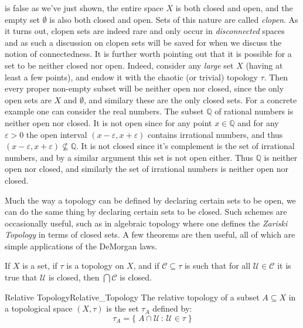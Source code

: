     is false as we've just shown, the entire space $X$ is both closed and open,
    and the empty set $\emptyset$ is also both closed and open. Sets of this
    nature are called \textit{clopen}. As it turns out, clopen
    sets are indeed rare and only occur in \textit{disconnected}
    spaces and
    as such a discussion on clopen sets will be saved for when we discuss the
    notion of connectedness. It is further worth pointing out that it is
    possible for a set to be neither closed nor open. Indeed, consider any
    \textit{large} set $X$ (having at least a few points), and endow it with the
    chaotic (or trivial) topology $\tau$. Then every proper non-empty subset
    will be neither open nor closed, since the only open sets are $X$ and
    $\emptyset$, and similary these are the only closed sets. For a concrete
    example one can consider the real numbers. The subset $\mathbb{Q}$ of
    rational numbers is neither open nor closed. It is not open since
    for any point $x\in\mathbb{Q}$ and for any $\varepsilon>0$ the open interval
    $(x-\varepsilon,x+\varepsilon)$ contains irrational numbers, and thus
    $(x-\varepsilon,x+\varepsilon)\nsubseteq\mathbb{Q}$. It is not closed since
    it's complement is the set of irrational numbers, and by a similar argument
    this set is not open either. Thus $\mathbb{Q}$ is neither open nor closed,
    and similarly the set of irrational numbers is neither open nor closed.
    \par\hfill\par
    Much the way a topology can be defined by declaring certain sets to be open,
    we can do the same thing by declaring certain sets to be closed. Such
    schemes are occasionally useful, such as in algebraic topology where one
    defines the \textit{Zariski Topology} in terms of
    closed sets. A few theorems are then useful, all of which are simple
    applications of the DeMorgan laws.
    \begin{theorem}
        If $X$ is a set, if $\tau$ is a topology on $X$, and if
        $\mathcal{C}\subseteq\tau$ is such that for all
        $\mathcal{U}\in\mathcal{C}$ it is true that $\mathcal{U}$ is closed,
        then $\bigcap\mathcal{C}$ is closed.
    \end{theorem}
    \begin{ldefinition}{Relative Topology}{Relative_Topology}
        The relative topology of a subset $A\subseteq{X}$ in a topological space
        $(X,\tau)$ is the set $\tau_{A}$ defined by:
        \begin{equation}
            \tau_{A}=\big\{\;A\cap\mathcal{U}\,:\,\mathcal{U}\in\tau\;\big\}
        \end{equation}
    \end{ldefinition}
